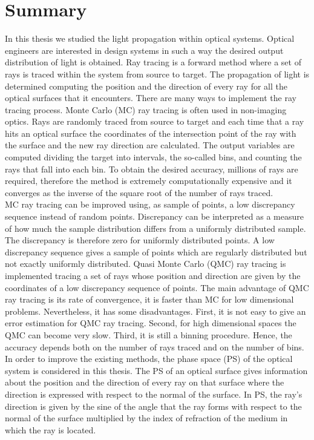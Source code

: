 \chapter*{Summary}
\markboth{}{}
In this thesis we studied the light propagation within optical systems.
Optical engineers are interested in design systems in such a way the desired output distribution of light is obtained. Ray tracing is a forward method where a set of rays is traced within the system from source to target. The propagation of light is determined computing the position and the direction of every ray for all the optical surfaces that it encounters. There are many ways to implement the ray tracing process. Monte Carlo (MC) ray tracing is often used in non-imaging optics. Rays are randomly traced from source to target and each time that a ray hits an optical surface the coordinates of the intersection point of the ray with the surface and the new ray direction are calculated. The output variables are computed dividing the target into intervals, the so-called bins, and counting the rays that fall into each bin. To obtain the desired accuracy, millions of rays are required, therefore the method is extremely computationally expensive and it converges as the inverse of the square root of the number of rays traced. 
\\ \indent 
MC ray tracing can be improved using, as sample of points, a low discrepancy sequence instead of random points. Discrepancy can be interpreted as a measure of how much the sample distribution differs from a uniformly distributed sample. The discrepancy is therefore zero for uniformly distributed points. A low discrepancy sequence gives a sample of points which are regularly distributed but not exactly uniformly distributed. Quasi Monte Carlo (QMC) ray tracing is implemented tracing a set of rays whose position and direction are given by the coordinates of a low discrepancy sequence of points.
The main advantage of QMC ray tracing is its rate of convergence, it is faster than MC for low dimensional problems. Nevertheless, it has some disadvantages. First, it is not easy to give an error estimation for QMC ray tracing. Second, for high dimensional spaces the QMC can become very slow. Third, it is still a binning procedure. Hence, the accuracy depends both on the number of rays traced and on the number of bins.
\\ \indent
In order to improve the existing methods, the phase space (PS) of the optical system is considered in this thesis. The PS of an optical surface gives information about the position and the direction of every ray on that surface where the direction is expressed with respect to the normal of the surface. In PS, the ray's direction is given by the sine of the angle that the ray forms with respect to the normal of the surface multiplied by the index of refraction of the medium in which the ray is located.
